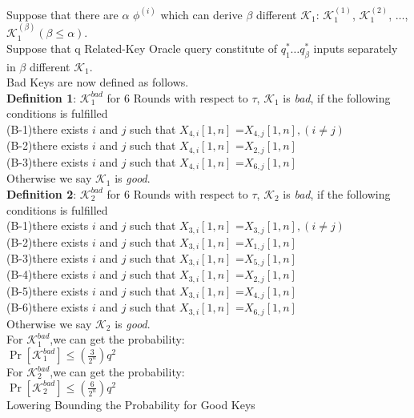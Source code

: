 \documentclass{article}
\begin{document}
Suppose that there are $\alpha$ $\phi^{(i)}$ which can derive $\beta$ different $\mathcal{K}_{1}$: $\mathcal{K}_{1}^{(1)}$, $\mathcal{K}_{1}^{(2)}$, $\dots$,$\mathcal{K}_{1}^{(\beta)}$$(\beta\leq \alpha)$.\\
Suppose that q Related-Key Oracle query constitute of $q_{1}^{\ast} \dots q_{\beta}^{\ast}$ inputs separately in $\beta$ different $\mathcal{K}_{1}$.\\
Bad Keys are now defined as follows.\\
\textbf{Definition 1}: $\mathcal{K}_{1}^{bad}$  for 6 Rounds
with respect to $\tau$, $\mathcal{K}_{1}$  is {\it bad}, if the following conditions is fulfilled\\
(B-1)there exists $i$ and $j$ such that $X_{4,i}[1,n]$ =$X_{4,j}[1,n],(i\neq j)$\\
(B-2)there exists $i$ and $j$ such that $X_{4,i}[1,n]$ =$X_{2,j}[1,n]$\\
(B-3)there exists $i$ and $j$ such that $X_{4,i}[1,n]$ =$X_{6,j}[1,n]$\\
Otherwise we say $\mathcal{K}_{1}$ is {\it good}.\\
\textbf{Definition 2}: $\mathcal{K}_{2}^{bad}$  for 6 Rounds
with respect to $\tau$, $\mathcal{K}_{2}$  is {\it bad}, if the following conditions is fulfilled \\
(B-1)there exists $i$ and $j$ such that $X_{3,i}[1,n]$ =$X_{3,j}[1,n],(i\neq j)$\\
(B-2)there exists $i$ and $j$ such that $X_{3,i}[1,n]$ =$X_{1,j}[1,n]$\\
(B-3)there exists $i$ and $j$ such that $X_{3,i}[1,n]$ =$X_{5,j}[1,n]$\\
(B-4)there exists $i$ and $j$ such that $X_{3,i}[1,n]$ =$X_{2,j}[1,n]$\\
(B-5)there exists $i$ and $j$ such that $X_{3,i}[1,n]$ =$X_{4,j}[1,n]$\\
(B-6)there exists $i$ and $j$ such that $X_{3,i}[1,n]$ =$X_{6,j}[1,n]$\\
Otherwise we say $\mathcal{K}_{2}$ is {\it good}.\\
For $\mathcal{K}_{1}^{bad}$,we can get the probability:\\
$\Pr[\mathcal{K}_{1}^{bad}]\leq (\frac{3}{2^{n}})q^{2}$\\
For $\mathcal{K}_{2}^{bad}$,we can get the probability:\\
$\Pr[\mathcal{K}_{2}^{bad}]\leq (\frac{6}{2^{n}})q^{2}$\\
Lowering Bounding the Probability for Good Keys\\
$$
\end{document}
